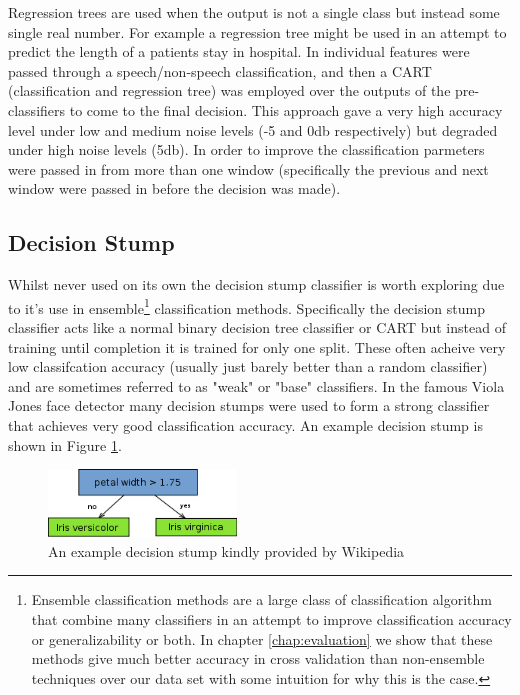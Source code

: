 \documentclass[ %
                    author={Sam Phippen},
                supervisor={Dr. Rafal Bogacz},
                     title={Real time voice activity detectors in noisy personal computing environments},
                  subtitle={},
                    degree={MEng},
                      year={2012} ]{thesis}
\begin{document}
Regression trees are used when the output is not a single class but instead
some single real number. For example a regression tree might be used in an
attempt to predict the length of a patients stay in hospital. In \cite{shin}
individual features were passed through a speech/non-speech classification, and
then a CART (classification and regression tree) was employed over the outputs
of the pre-classifiers to come to the final decision. This approach gave a very
high accuracy level under low and medium noise levels (-5 and 0db respectively)
but degraded under high noise levels (5db). In order to improve the
classification parmeters were passed in from more than one window (specifically
the previous and next window were passed in before the decision was made).

\subsection{Decision Stump}

Whilst never used on its own the decision stump classifier is worth exploring
due to it's use in ensemble\footnote{Ensemble classification methods are a
    large class of classification algorithm that combine many classifiers in an
    attempt to improve classification accuracy or generalizability or both. In
chapter \ref{chap:evaluation} we show that these methods give much better
accuracy in cross validation than non-ensemble techniques over our data set
with some intuition for why this is the case.} classification methods.
Specifically the decision stump classifier acts like a normal binary decision
tree classifier or CART but instead of training until completion it is trained
for only one split. These often acheive very low classifcation accuracy
(usually just barely better than a random classifier) and are sometimes
referred to as "weak" or "base" classifiers. In the famous Viola Jones face
detector\cite{viola} many decision stumps were used to form a strong classifier
that achieves very good classification accuracy. An example decision stump is
shown in Figure \ref{fig:decision-stump}.

\begin{figure}

    \includegraphics[width=5cm]{decision_stump.png}

    \label{fig:decision-stump}
    \caption{An example decision stump kindly provided by Wikipedia}
\end{figure}
\end{document}
